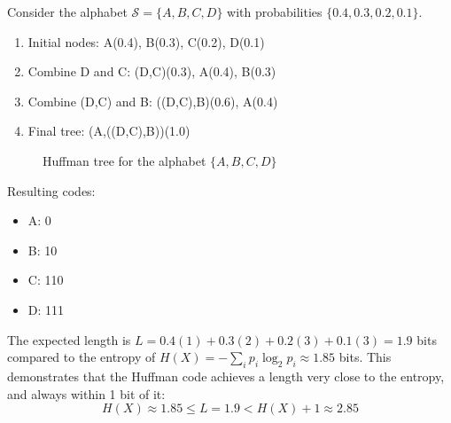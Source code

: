     \begin{example}
      \label{ex:huffman-coding}
      Consider the alphabet $\mathcal{S} = \{A, B, C, D\}$ with probabilities $\{0.4, 0.3, 0.2, 0.1\}$.

      \begin{enumerate}
        \item Initial nodes: A(0.4), B(0.3), C(0.2), D(0.1)
        \item Combine D and C: (D,C)(0.3), A(0.4), B(0.3)
        \item Combine (D,C) and B: ((D,C),B)(0.6), A(0.4)
        \item Final tree: (A,((D,C),B))(1.0)
      \end{enumerate}

      \begin{figure}[H]
        \centering
        \caption{Huffman tree for the alphabet $\{A, B, C, D\}$}
        \label{fig:huffman_tree}
      \end{figure}

      Resulting codes:
      \begin{itemize}
        \item A: 0
        \item B: 10
        \item C: 110
        \item D: 111
      \end{itemize}

      The expected length is $L = 0.4(1) + 0.3(2) + 0.2(3) + 0.1(3) = 1.9$ bits compared to the entropy of $H(X) = -\sum_{i} p_i \log_2 p_i \approx 1.85$ bits. This demonstrates that the Huffman code achieves a length very close to the entropy, and always within 1 bit of it:
      \begin{equation}
        H(X) \approx 1.85 \leq L = 1.9 < H(X) + 1 \approx 2.85
      \end{equation}
    \end{example}

